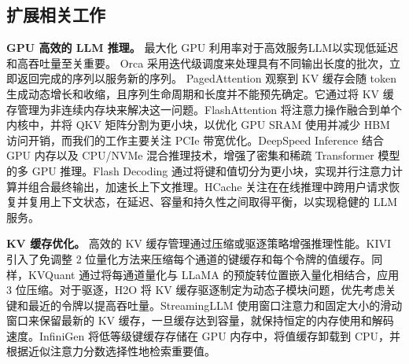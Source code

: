 \documentclass[11pt]{article}
\begin{document}
\subsection{扩展相关工作}
\textbf{GPU 高效的 LLM 推理。} 
最大化 GPU 利用率对于高效服务LLM以实现低延迟和高吞吐量至关重要。
Orca \cite{yu2022orca} 采用迭代级调度来处理具有不同输出长度的批次，立即返回完成的序列以服务新的序列。 
PagedAttention \cite{kwon2023vllm} 观察到 KV 缓存会随 token 生成动态增长和收缩，且序列生命周期和长度并不能预先确定。它通过将 KV 缓存管理为非连续内存块来解决这一问题。FlashAttention \cite{dao2022flashattention} 将注意力操作融合到单个内核中，并将 QKV 矩阵分割为更小块，以优化 GPU SRAM 使用并减少 HBM 访问开销，而我们的工作主要关注 PCIe 带宽优化。DeepSpeed Inference \cite{aminabadi2022deepspeed} 结合 GPU 内存以及 CPU/NVMe 混合推理技术，增强了密集和稀疏 Transformer 模型的多 GPU 推理。Flash Decoding \cite{flashdecoding2023} 通过将键和值切分为更小块，实现并行注意力计算并组合最终输出，加速长上下文推理。HCache \cite{gao2025fast} 关注在在线推理中跨用户请求恢复并复用上下文状态，在延迟、容量和持久性之间取得平衡，以实现稳健的 LLM 服务。

\noindent \textbf{KV 缓存优化。} 
高效的 KV 缓存管理通过压缩或驱逐策略增强推理性能。KIVI \cite{liu2024kivi} 引入了免调整 2 位量化方法来压缩每个通道的键缓存和每个令牌的值缓存。同样，KVQuant \cite{hooper2024kvquant} 通过将每通道量化与 LLaMA 的预旋转位置嵌入量化相结合，应用 3 位压缩。对于驱逐，H2O \cite{zhang2023h2o} 将 KV 缓存驱逐制定为动态子模块问题，优先考虑关键和最近的令牌以提高吞吐量。StreamingLLM \cite{xiao2023efficient} 使用窗口注意力和固定大小的滑动窗口来保留最新的 KV 缓存，一旦缓存达到容量，就保持恒定的内存使用和解码速度。InfiniGen \cite{lee2024infinigen} 将低等级键缓存存储在 GPU 内存中，将值缓存卸载到 CPU，并根据近似注意力分数选择性地检索重要值。
\end{document}
